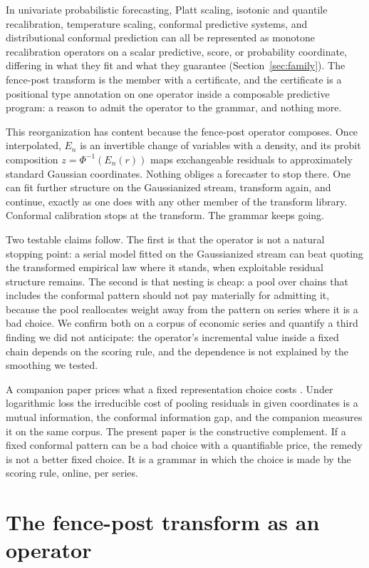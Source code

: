 \documentclass[11pt]{article}
\theoremstyle{remark}
\begin{document}
In univariate probabilistic forecasting, Platt scaling,
isotonic and quantile recalibration, temperature scaling, conformal predictive systems,
and distributional conformal prediction can all be represented as monotone recalibration
operators on a scalar predictive, score, or probability coordinate, differing in what
they fit and what they guarantee
(Section~\ref{sec:family}). The fence-post transform is the member with a certificate,
and the certificate is a positional type annotation on one operator inside a composable
predictive program: a reason to admit the operator to the grammar, and nothing more.

This reorganization has content because the fence-post operator composes. Once interpolated,
$E_n$ is an invertible change of variables with a density, and its probit composition
$z = \Phi^{-1}(E_n(r))$ maps exchangeable residuals to approximately standard Gaussian
coordinates. Nothing obliges a forecaster to stop there. One can fit further structure on
the Gaussianized stream, transform again, and continue, exactly as one does with any other
member of the transform library. Conformal calibration stops at the transform. The grammar
keeps going.

Two testable claims follow. The first is that the operator is not a natural stopping
point: a serial model fitted on the Gaussianized stream can beat quoting the
transformed empirical law where it stands, when exploitable residual structure
remains. The second is that nesting is
cheap: a pool over chains that includes the conformal pattern should not pay materially
for admitting it, because the pool reallocates weight away from the pattern on series
where it is a bad choice. We confirm both on a corpus of economic series and quantify a third
finding we did not anticipate: the operator's incremental value inside a fixed chain
depends on the scoring rule, and the dependence is not explained by the smoothing we
tested.

A companion paper prices what a fixed representation choice costs
\citep{cotton2026gap}. Under logarithmic loss the irreducible cost of pooling residuals in
given coordinates is a mutual information, the conformal information gap, and the companion
measures it on the same corpus. The present paper is the constructive complement. If a fixed
conformal pattern can be a bad choice with a quantifiable price, the remedy is not a better
fixed choice. It is a grammar in which the choice is made by the scoring rule, online,
per series.

\section{The fence-post transform as an operator}\label{sec:operator}
\end{document}
